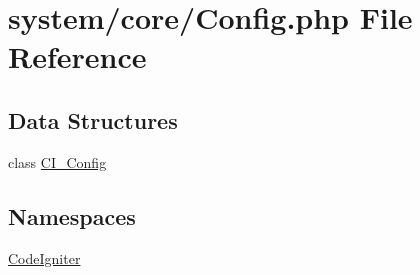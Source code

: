 \hypertarget{system_2core_2config_8php}{}\section{system/core/\+Config.php File Reference}
\label{system_2core_2config_8php}
\subsection*{Data Structures}
\begin{DoxyCompactItemize}
\item 
class \mbox{\hyperlink{class_c_i___config}{C\+I\+\_\+\+Config}}
\end{DoxyCompactItemize}
\subsection*{Namespaces}
\begin{DoxyCompactItemize}
\item 
 \mbox{\hyperlink{namespace_code_igniter}{Code\+Igniter}}
\end{DoxyCompactItemize}
